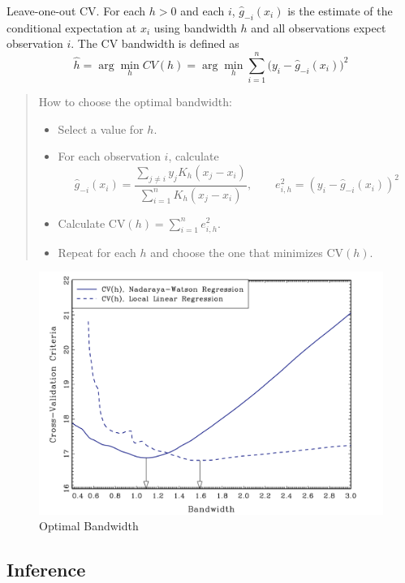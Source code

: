 \documentclass[12pt,]{book}
\providecommand{\tightlist}{%
  \setlength{\itemsep}{0pt}\setlength{\parskip}{0pt}}
\begin{document}
Leave-one-out CV. For each \(h > 0\) and each \(i\), \(\hat{g}_{-i} (x_i)\) is the estimate of the conditional expectation at \(x_i\) using bandwidth \(h\) and all observations expect observation \(i\). The CV bandwidth is defined as
\[
    \hat{h} = \arg \min_h CV(h) = \arg \min_h \sum_{i=1}^n  \Big( y_i -  \hat{g}_{-i} (x_i) \Big)^2
\]

\begin{quote}
How to choose the optimal bandwidth:

\begin{itemize}
\tightlist
\item
  Select a value for \(h\).
\item
  For each observation \(i\), calculate
  \[
  \hat{g}_{-i} (x_i) = \frac{\sum_{j \ne i} y_j K_h (x_j - x_i) }{\sum_{i=1}^n K_h (x_j - x_i)}, \qquad e_{i,h}^2 = \left(y_i - \hat{g}_{-i} (x_i) \right)^2
  \]
\item
  Calculate \(\text{CV}(h) = \sum_{i=1}^n e^2_{i,h}\).
\item
  Repeat for each \(h\) and choose the one that minimizes \(\text{CV}(h)\).
\end{itemize}
\end{quote}

\begin{figure}
\centering
\includegraphics{figures/Fig_524.png}
\caption{Optimal Bandwidth}
\end{figure}

\hypertarget{inference-1}{%
\subsection{Inference}\label{inference-1}}
\end{document}
